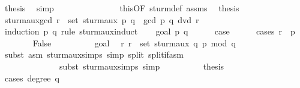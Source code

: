 \begin{isabellebody}
\ {\isacharquery}thesis\ \isamarkupfalse%
\ simp\isanewline
\ \ \ \ \ \ \isamarkupfalse%
\isanewline
\ \ \ \ \isamarkupfalse%
\isacommand{{\isacharbraceright}}\isamarkupfalse%
\isanewline
\ \ \isamarkupfalse%
\ this{\isacharbrackleft}OF\ sturm{\isacharunderscore}def\ assms{\isacharbrackright}\ \isamarkupfalse%
\ {\isacharquery}thesis\ \isacommand{{\isachardot}}\isamarkupfalse%
\isanewline
{}\isamarkupfalse%
%
\endisatagproof
{\isafoldproof}%
%
\isadelimproof
\isanewline
%
\endisadelimproof
\isanewline
{}\isamarkupfalse%
\ sturm{\isacharunderscore}aux{\isacharunderscore}gcd{\isacharcolon}\ {\isachardoublequoteopen}r\ {\isasymin}\ set\ {\isacharparenleft}sturm{\isacharunderscore}aux\ p\ q{\isacharparenright}\ {\isasymLongrightarrow}\ gcd\ p\ q\ dvd\ r{\isachardoublequoteclose}\isanewline
%
\isadelimproof
%
\endisadelimproof
%
\isatagproof
{}\isamarkupfalse%
\ {\isacharparenleft}induction\ p\ q\ rule{\isacharcolon}\ sturm{\isacharunderscore}aux{\isachardot}induct{\isacharparenright}\isanewline
\ \ \isamarkupfalse%
\ {\isacharparenleft}goal{}\ p\ q{\isacharparenright}\isanewline
\ \ \ \ \isamarkupfalse%
\ {\isacharquery}case\isanewline
\ \ \ \ \isamarkupfalse%
\ {\isacharparenleft}cases\ {\isachardoublequoteopen}r\ {\isacharequal}\ p{\isachardoublequoteclose}{\isacharparenright}\isanewline
\ \ \ \ \ \ \isamarkupfalse%
\ False\isanewline
\ \ \ \ \ \ \ \ \isamarkupfalse%
\ goal{}{\isacharparenleft}{}{\isacharparenright}\ \isamarkupfalse%
\ r{\isacharcolon}\ {\isachardoublequoteopen}r\ {\isasymin}\ set\ {\isacharparenleft}sturm{\isacharunderscore}aux\ q\ {\isacharparenleft}{\isacharminus}{\isacharparenleft}p\ mod\ q{\isacharparenright}{\isacharparenright}{\isacharparenright}{\isachardoublequoteclose}\ \isanewline
\ \ \ \ \ \ \ \ \ \ \isamarkupfalse%
\ {\isacharparenleft}subst\ {\isacharparenleft}asm{\isacharparenright}\ sturm{\isacharunderscore}aux{\isachardot}simps{\isacharcomma}\ simp\ split{\isacharcolon}\ split{\isacharunderscore}if{\isacharunderscore}asm{\isacharcomma}\isanewline
\ \ \ \ \ \ \ \ \ \ \ \ \ \ subst\ sturm{\isacharunderscore}aux{\isachardot}simps{\isacharcomma}\ simp{\isacharparenright}\isanewline
\ \ \ \ \ \ \ \ \isamarkupfalse%
\ {\isacharquery}thesis\isanewline
\ \ \ \ \ \ \ \ \isamarkupfalse%
\ {\isacharparenleft}cases\ {\isachardoublequoteopen}degree\ q\ {\isacharequal}\ {}{\isachardoublequoteclose}{\isacharparenright}\isanewline

\end{isabellebody}
